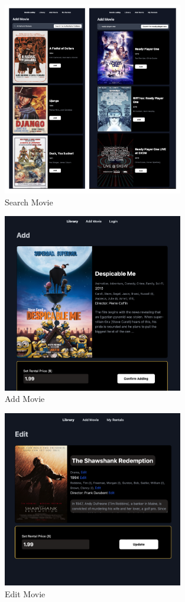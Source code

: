 \documentclass{article}
\begin{document}
\begin{figure}[!htp]
\centering
\includegraphics[width=0.7\textwidth]{search.png}
\caption{\label{fig:search}Search Movie}
\end{figure}

\begin{figure}[!htp]
\centering
\includegraphics[width=0.7\textwidth]{add.png}
\caption{\label{fig:add}Add Movie}
\end{figure}

\begin{figure}[!htp]
\centering
\includegraphics[width=0.7\textwidth]{edit.png}
\caption{\label{fig:edit}Edit Movie}
\end{figure}

\newpage


\end{document}
